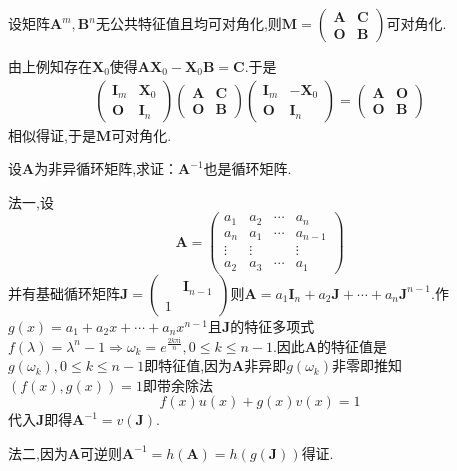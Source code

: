 \begin{brown}
\begin{example}
    设矩阵$\bm{A}^m,\bm{B}^n$无公共特征值且均可对角化,则$\bm{M}=\begin{pmatrix}
        \bm{A}&\bm{C}\\\bm{O}&\bm{B}
    \end{pmatrix}$可对角化.
\end{example}
\begin{Proof}
由上例知存在$\bm{X}_0$使得$\bm{AX}_0-\bm{X}_0\bm{B}=\bm{C}$.于是
\begin{align*}
    \begin{pmatrix}
        \bm{I}_m&\bm{X}_0\\\bm{O}&\bm{I}_n
    \end{pmatrix}\begin{pmatrix}
        \bm{A}&\bm{C}\\\bm{O}&\bm{B}
    \end{pmatrix}\begin{pmatrix}
        \bm{I}_m&-\bm{X}_0\\\bm{O}&\bm{I}_n
    \end{pmatrix}=\begin{pmatrix}
        \bm{A}&\bm{O}\\\bm{O}&\bm{B}
    \end{pmatrix}
\end{align*}
相似得证,于是$\bm{M}$可对角化.
\end{Proof}
\end{brown}
\begin{brown}
\begin{example}
    设$\bm{A}$为非异循环矩阵,求证：$\bm{A}^{-1}$也是循环矩阵.
\end{example}
\begin{Proof}
法一,设\newpage\[
\bm{A}=\begin{pmatrix}
    a_1&a_2&\cdots&a_n\\
    a_n&a_1&\cdots&a_{n-1}\\
    \vdots&\vdots&&\vdots\\
    a_2&a_3&\cdots&a_1
\end{pmatrix}
\]并有基础循环矩阵$\bm{J}=\begin{pmatrix}
    &\bm{I}_{n-1}\\1&
\end{pmatrix}$则$\bm{A}=a_1\bm{I}_n+a_2\bm{J}+\cdots+a_n\bm{J}^{n-1}$.作$g\left(x\right)=a_1+a_2x+\cdots+a_nx^{n-1}$且$\bm{J}$的特征多项式$\displaystyle
f\left(\lambda\right)=\lambda^n-1\Longrightarrow\omega_k=e^{\frac{2k\pi \mathrm{i}}{n}},0\leqslant k\leqslant n-1
$.因此$\bm{A}$的特征值是$g\left(\omega_k\right),0\leqslant k\leqslant n-1$即特征值,因为$\bm{A}$非异即$g\left(\omega_k\right)$非零即推知$\left(
    f\left(x\right),g\left(x\right)
\right)=1$即带余除法
\[
f\left(x\right)u\left(x\right)+g\left(x\right)v\left(x\right)=1
\]代入$\bm{J}$即得$\bm{A}^{-1}=v\left(\bm{J}\right).$

法二,因为$\bm{A}$可逆则$\bm{A}^{-1}=h\left(\bm{A}\right)=h\left(g\left(\bm{J}\right)\right)$得证.
\end{Proof}
\end{brown}